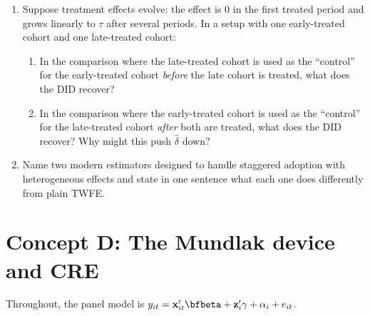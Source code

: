 \documentclass{article}
\begin{document}
\begin{enumerate}[label=\textbf{C.\arabic*},leftmargin=*,itemsep=10pt]
\item  Suppose treatment effects evolve: the effect is $0$ in the first treated period and grows linearly to $\tau$ after several periods.  In a setup with one early-treated cohort and one late-treated cohort:
\begin{enumerate}[label=(\alph*)]
  \item In the comparison where the late-treated cohort is used as the ``control'' for the early-treated cohort \emph{before} the late cohort is treated, what does the DID recover?
  \item In the comparison where the early-treated cohort is used as the ``control'' for the late-treated cohort \emph{after} both are treated, what does the DID recover?  Why might this push $\hat\delta$ down?
\end{enumerate}

\item  Name two modern estimators designed to handle staggered adoption with heterogeneous effects and state in one sentence what each one does differently from plain TWFE.

\end{enumerate}

\bigskip

\section*{Concept D: The Mundlak device and CRE}

Throughout, the panel model is $y_{it} = \bm x_{it}'\bfbeta + \bm z_i'\bm\gamma + \alpha_i + e_{it}$.
\end{document}
